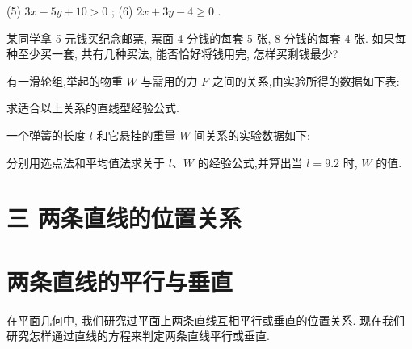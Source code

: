 \documentclass[lang=cn,newtx,10pt,scheme=chinese]{elegantbook}
\begin{document}
\begin{problemset}[习 题 二]
(5) \({3x} - {5y} + {10} > 0\) ; (6) \({2x} + {3y} - 4 \geq 0\) .

\item * 某同学拿 5 元钱买纪念邮票, 票面 4 分钱的每套 5 张, 8 分钱的每套 4 张. 如果每种至少买一套, 共有几种买法, 能否恰好将钱用完, 怎样买剩钱最少?

\item * 有一滑轮组,举起的物重 \(W\) 与需用的力 \(F\) 之间的关系,由实验所得的数据如下表:

\begin{center}
\end{center}

求适合以上关系的直线型经验公式.

\item * 一个弹簧的长度 \(l\) 和它悬挂的重量 \(W\) 间关系的实验数据如下:

\begin{center}
\end{center}

分别用选点法和平均值法求关于 \(l\text{、}W\) 的经验公式,并算出当 \(l = {9.2}\) 时, \(W\) 的值.

\end{problemset}

\section*{三 两条直线的位置关系}

\section{两条直线的平行与垂直}

在平面几何中, 我们研究过平面上两条直线互相平行或垂直的位置关系. 现在我们研究怎样通过直线的方程来判定两条直线平行或垂直.
\end{document}
